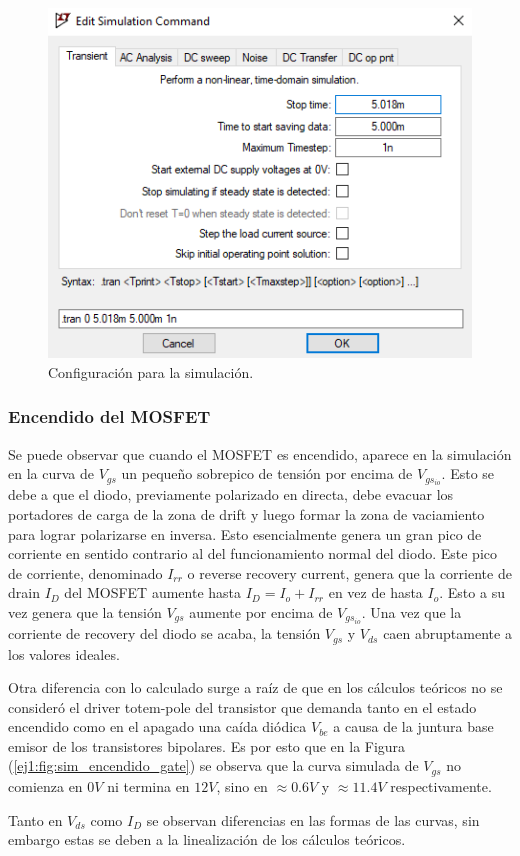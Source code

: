 \begin{figure}[H]
	\centering
	\includegraphics[width=0.4\linewidth]{ImagenesEjercicio-1/spice_specs}
	\caption{Configuración para la simulación.}
	\label{ej1:fig:spice_specs}
\end{figure}

\subsubsection{Encendido del MOSFET}

Se puede observar que cuando el MOSFET es encendido, aparece en la simulación en la curva de $V_{gs}$ un pequeño sobrepico de tensión por encima de $V_{gs_{io}}$. Esto se debe a que el diodo, previamente polarizado en directa, debe evacuar los portadores de carga de la zona de drift y luego formar la zona de vaciamiento para lograr polarizarse en inversa. Esto esencialmente genera un gran pico de corriente en sentido contrario al del funcionamiento normal del diodo. Este pico de corriente, denominado $I_{rr}$ o reverse recovery current, genera que la corriente de drain $I_D$ del MOSFET aumente hasta $I_D = I_o+I_{rr}$ en vez de hasta $I_o$. Esto a su vez genera que la tensión $V_{gs}$ aumente por encima de $V_{gs_{io}}$. Una vez que la corriente de recovery del diodo se acaba, la tensión $V_{gs}$ y $V_{ds}$ caen abruptamente a los valores ideales.

Otra diferencia con lo calculado surge a raíz de que en los cálculos teóricos no se consideró el driver totem-pole del transistor que demanda tanto en el estado encendido como en el apagado una caída diódica $V_{be}$ a causa de la juntura base emisor de los transistores bipolares. Es por esto que en la Figura (\ref{ej1:fig:sim_encendido_gate}) se observa que la curva simulada de $V_{gs}$ no comienza en $0V$ ni termina en $12V$, sino en $\approx 0.6V$ y $\approx 11.4V$ respectivamente.

Tanto en $V_{ds}$ como $I_D$ se observan diferencias en las formas de las curvas, sin embargo estas se deben a la linealización de los cálculos teóricos.

